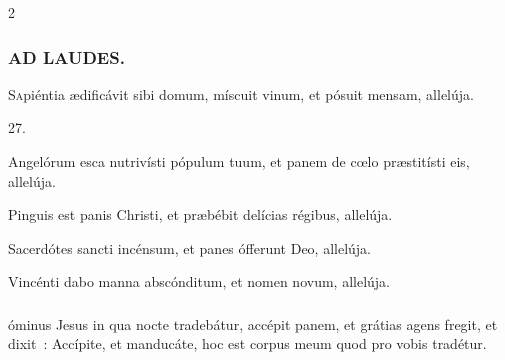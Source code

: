 \documentclass[9pt,twoside]{extarticle}
\begin{document}
\begin{multicols}{2}
{{\subsubsection*{\center \textsc{AD LAUDES.}}
\begin{center}\end{center}
\lettrine{S}apiéntia ædificávit sibi domum, míscuit vinum, et pósuit mensam, allelúja.

\begin{tightlist}{}
\item {} 27.
\item {} Angelórum esca nutrivísti pópulum tuum, et panem de cœlo præstitísti eis, allelúja.
\item {} Pinguis est panis Christi, et præbébit delícias régibus, allelúja.
\item {} Sacerdótes sancti incénsum, et panes ófferunt Deo, allelúja.
\item {} Vincénti dabo manna abscónditum, et nomen novum, allelúja.
\end{tightlist}

\subsubsection*{}
óminus Jesus in qua nocte tradebátur, accépit panem, et grátias agens fregit, et dixit~: Accípite, et manducáte, hoc est corpus meum quod pro vobis tradétur.

}}
\end{multicols}
\end{document}
